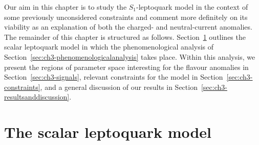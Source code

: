 Our aim in this chapter is to study the $S_{1}$-leptoquark model in the context
of some previously unconsidered constraints and comment more definitely on its
viability as an explanation of both the charged- and neutral-current anomalies.
The remainder of this chapter is structured as follows.
Section~\ref{sec:ch3-thescalarleptoquarkmodel} outlines the scalar leptoquark
model in which the phenomenological analysis of
Section~\ref{sec:ch3-phenomenologicalanalysis} takes place. Within this
analysis, we present the regions of parameter space interesting for the flavour
anomalies in Section~\ref{sec:ch3-signals}, relevant constraints for the model
in Section~\ref{sec:ch3-constraints}, and a general discussion of our results in
Section~\ref{sec:ch3-resultsanddiscussion}.

\section{The scalar leptoquark model}
\label{sec:ch3-thescalarleptoquarkmodel}

